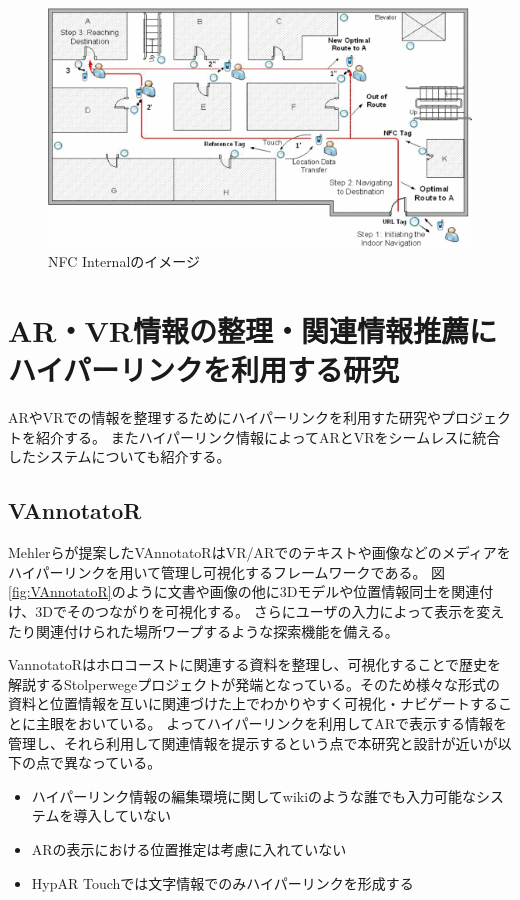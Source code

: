 \begin{figure}[h]
  \centering 
  \includegraphics[width=150mm]{images/NFC_Internal.png}
  \caption{NFC Internalのイメージ} \label{fig:NFC_Internal}
\end{figure}



\section{AR・VR情報の整理・関連情報推薦にハイパーリンクを利用する研究}
ARやVRでの情報を整理するためにハイパーリンクを利用すた研究やプロジェクトを紹介する。
またハイパーリンク情報によってARとVRをシームレスに統合したシステムについても紹介する。



\subsection{VAnnotatoR}
Mehlerらが提案したVAnnotatoR\cite{10.1145/3209542.3209572}はVR/ARでのテキストや画像などのメディアをハイパーリンクを用いて管理し可視化するフレームワークである。
図\ref{fig:VAnnotatoR}のように文書や画像の他に3Dモデルや位置情報同士を関連付け、3Dでそのつながりを可視化する。
さらにユーザの入力によって表示を変えたり関連付けられた場所ワープするような探索機能を備える。

VannotatoRはホロコーストに関連する資料を整理し、可視化することで歴史を解説するStolperwegeプロジェクトが発端となっている。そのため様々な形式の資料と位置情報を互いに関連づけた上でわかりやすく可視化・ナビゲートすることに主眼をおいている。
よってハイパーリンクを利用してARで表示する情報を管理し、それら利用して関連情報を提示するという点で本研究と設計が近いが以下の点で異なっている。
\begin{itemize} 
  \item ハイパーリンク情報の編集環境に関してwikiのような誰でも入力可能なシステムを導入していない
  \item ARの表示における位置推定は考慮に入れていない
  \item HypAR Touchでは文字情報でのみハイパーリンクを形成する
\end{itemize}

